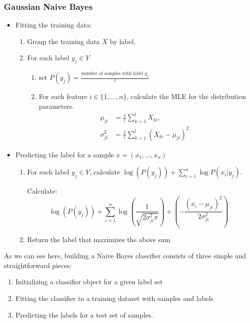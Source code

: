 \documentclass[12pt]{article}
\newcommand{\p}[1]{\left(#1\right)}
\begin{document}
\subsubsection*{Gaussian Naive Bayes}
\begin{itemize}
    \item Fitting the training data:
    \begin{enumerate}
        \item Group the training data $X$ by label.
        \item For each label $y_j \in Y$
            \begin{enumerate}
                \item set $P(y_j) = \frac{\text{number of samples with label $y_j$}}{l}$
                \item For each feature $i \in \{1, \ldots, n\}$, calculate the MLE for the distribution parameters.
                \begin{align}
                \mu_{ji} &= \frac{1}{l} \sum_{k=1}^l X_{ki},\\ 
                \sigma^2_{ji} &= \frac{1}{l} \sum_{k=1}^l (X_{ki} - \mu_{ji})^2
                \end{align}
            \end{enumerate}
    \end{enumerate}
    \item Predicting the label for a sample $x = (x_1, \ldots, x_n)$
    \begin{enumerate}
        \item For each label $y_j \in Y$, calculate $\log(P(y_j)) + \sum_{i=1}^n \log{P(x_i | y_j)}$. 
        
         Calculate: $$ \log(P(y_j)) + \sum_{i=1}^n \log\p{\frac{1}{\sqrt{2 \sigma_{ji}^2 \pi}}} +  \p{-\frac{(x_i - \mu_{ji})^2}{2 \sigma_{ji}^2}}$$
        \item Return the label that maximizes the above sum
    \end{enumerate}
\end{itemize}

As we can see here, building a Naive Bayes classifier consists of three simple and straightforward pieces:
\begin{enumerate}
    \item Initializing a classifier object for a given label set
    \item Fitting the classifier to a training dataset with samples and labels
    \item Predicting the labels for a test set of samples.
\end{enumerate}
\end{document}
